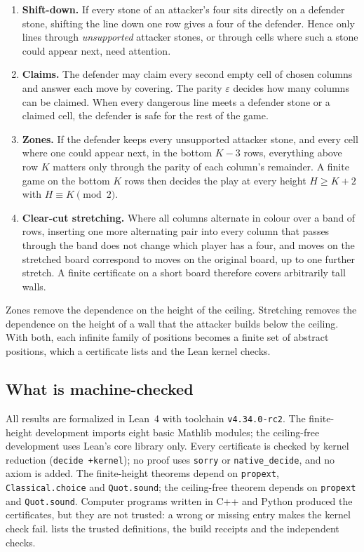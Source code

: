 \documentclass[11pt,a4paper]{article}
\theoremstyle{plain}
\theoremstyle{definition}
\newcommand{\code}[1]{{\upshape\texttt{\small\nolinkurl{#1}}}}
\newcommand{\eps}{\varepsilon}
\begin{document}
\begin{enumerate}
  \item \textbf{Shift-down.} If every stone of an attacker's four sits directly on a defender stone, shifting the line down one row gives a four of the defender. Hence only lines through \emph{unsupported} attacker stones, or through cells where such a stone could appear next, need attention.
  \item \textbf{Claims.} The defender may claim every second empty cell of chosen columns and answer each move by covering. The parity $\eps$ decides how many columns can be claimed. When every dangerous line meets a defender stone or a claimed cell, the defender is safe for the rest of the game.
  \item \textbf{Zones.} If the defender keeps every unsupported attacker stone, and every cell where one could appear next, in the bottom $K-3$ rows, everything above row $K$ matters only through the parity of each column's remainder. A finite game on the bottom $K$ rows then decides the play at every height $H\ge K+2$ with $H\equiv K \pmod 2$.
  \item \textbf{Clear-cut stretching.} Where all columns alternate in colour over a band of rows, inserting one more alternating pair into every column that passes through the band does not change which player has a four, and moves on the stretched board correspond to moves on the original board, up to one further stretch. A finite certificate on a short board therefore covers arbitrarily tall walls.
\end{enumerate}

Zones remove the dependence on the height of the ceiling. Stretching removes the dependence on the height of a wall that the attacker builds below the ceiling. With both, each infinite family of positions becomes a finite set of abstract positions, which a certificate lists and the Lean kernel checks.

\subsection{What is machine-checked}

All results are formalized in Lean~4 \cite{lean4} with toolchain \code{v4.34.0-rc2}. The finite-height development imports eight basic Mathlib \cite{mathlib} modules; the ceiling-free development uses Lean's core library only. Every certificate is checked by kernel reduction (\code{decide +kernel}); no proof uses \code{sorry} or \code{native_decide}, and no axiom is added. The finite-height theorems depend on \code{propext}, \code{Classical.choice} and \code{Quot.sound}; the ceiling-free theorem depends on \code{propext} and \code{Quot.sound}. Computer programs written in C++ and Python produced the certificates, but they are not trusted: a wrong or missing entry makes the kernel check fail.  lists the trusted definitions, the build receipts and the independent checks.
\end{document}

